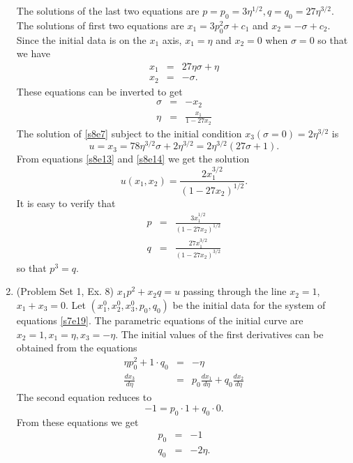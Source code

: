 \documentclass{article}
\newcommand{\td}[2]{\frac{d{#1}}{d{#2}}}
\theoremstyle{plain}
\numberwithin{thm}{section}
\theoremstyle{plain}
\numberwithin{prop}{section}
\theoremstyle{definition}
\numberwithin{defn}{section}
\theoremstyle{remark}
\numberwithin{equation}{section}
\begin{document}
\begin{enumerate}
The solutions of the last two equations are $p = p_0= 3\eta^{1/2}, q = q_0 = 27\eta^{3/2}$. The
solutions of first two equations are $x_1 = 3p_0^2\sigma + c_1$ and $x_2 = -\sigma + c_2$. Since the
initial data is on the $x_1$ axis, $x_1 = \eta$ and $x_2 = 0$ when $\sigma = 0$ so that we have
\begin{eqnarray}
x_1 &=& 27\eta\sigma + \eta \label{s8e10} \\
x_2 &=& -\sigma. \label{s8e11}
\end{eqnarray}
These equations can be inverted to get
\begin{eqnarray}
\sigma &=& -x_2 \label{s8e12} \\
\eta &=& \frac{x_1}{1 - 27 x_2} \label{s8e13}
\end{eqnarray}
The solution of \eqref{s8e7} subject to the initial condition $x_3(\sigma = 0) = 2\eta^{3/2}$ is
\begin{equation}\label{s8e14}
u = x_3 = 78\eta^{3/2}\sigma + 2\eta^{3/2} = 2\eta^{3/2}(27\sigma + 1).
\end{equation}
From equations \eqref{s8e13} and \eqref{s8e14} we get the solution
\begin{equation}\label{s8e15}
u(x_1, x_2) = \frac{2x_1^{3/2}}{(1 - 27x_2)^{1/2}}.
\end{equation}
It is easy to verify that
\begin{eqnarray*}
p &=& \frac{3x_1^{1/2}}{(1 - 27x_2)^{1/2}} \\
q &=& \frac{27x_1^{3/2}}{(1 - 27x_2)^{3/2}}
\end{eqnarray*}
so that $p^3 = q$.

\item (Problem Set 1, Ex. 8) $x_1p^2 + x_2q = u$ passing through the line $x_2 = 1$, $x_1 + x_3 = 0$.
Let $(x_1^0, x_2^0, x_3^0, p_0, q_0)$ be the initial data for the system of equations \eqref{s7e19}.
The parametric equations of the initial curve are $x_2 = 1, x_1 = \eta, x_3 = -\eta$. The initial
values of the first derivatives can be obtained from the equations
\begin{eqnarray*}
\eta p_0^2 + 1\cdot q_0 &=& -\eta \\
\td{x_3}{\eta} &=& p_0\td{x_1}{\eta} + q_0\td{x_2}{\eta}
\end{eqnarray*}
The second equation reduces to
\[
-1 = p_0\cdot 1 + q_0\cdot 0.
\]
From these equations we get
\begin{eqnarray}
p_0 &=& -1 \label{s8e16} \\
q_0 &=& -2\eta. \label{s8e17}
\end{eqnarray}


\end{enumerate}
\end{document}
